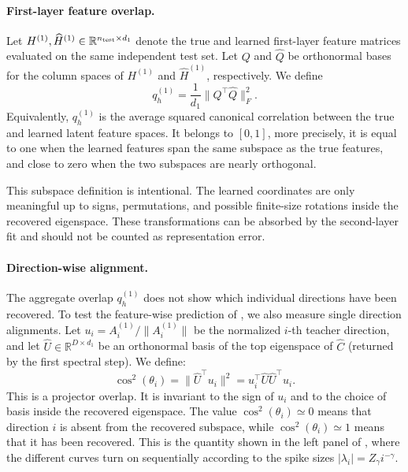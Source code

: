 \documentclass[]{article}
\numberwithin{equation}{section}
\theoremstyle{definition}
\begin{document}
\paragraph{First-layer feature overlap.}
Let $H^{(1)},\widehat H^{(1)}\in\mathbb R^{n_{\rm test}\times d_1}$ denote the true and learned first-layer feature matrices evaluated on the same independent test set. Let $Q$ and $\widehat Q$ be orthonormal bases for the column spaces of $H^{(1)}$ and $\widehat H^{(1)}$, respectively. We define
\begin{equation}
    q_h^{(1)}
    =
    \frac{1}{d_1}\|Q^\top \widehat Q\|_F^2 .
    \label{eq:first_layer_feature_overlap}
\end{equation}
Equivalently, $q_h^{(1)}$ is the average squared canonical correlation between the true and learned latent feature spaces. It belongs to $[0,1]$, more precisely, it is equal to one when the learned features span the same subspace as the true features, and close to zero when the two subspaces are nearly orthogonal.

This subspace definition is intentional. The learned coordinates are only meaningful up to signs, permutations, and possible finite-size rotations inside the recovered eigenspace. These transformations can be absorbed by the second-layer fit and should not be counted as representation error.


\paragraph{Direction-wise alignment.}
The aggregate overlap $q_h^{(1)}$ does not show which individual directions have been recovered. To test the feature-wise prediction of , we also measure single direction alignments. Let $u_i=A_i^{(1)}/\|A_i^{(1)}\|$ be the normalized $i$-th teacher direction, and let $\widehat U\in\mathbb R^{D\times d_1}$ be an orthonormal basis of the top eigenspace of $\widehat C$ (returned by the first spectral step). We define:
\begin{equation}
    \cos^2(\theta_i)
    =
    \|\widehat U^\top u_i\|^2
    =
    u_i^\top \widehat U\widehat U^\top u_i .
    \label{eq:direction_wise_cosine}
\end{equation}
This is a projector overlap. It is invariant to the sign of $u_i$ and to the choice of basis inside the recovered eigenspace. The value $\cos^2(\theta_i)\simeq 0$ means that direction $i$ is absent from the recovered subspace, while $\cos^2(\theta_i)\simeq 1$ means that it has been recovered. This is the quantity shown in the left panel of , where the different curves turn on sequentially according to the spike sizes $|\lambda_i|=Z_\gamma i^{-\gamma}$.
\end{document}
